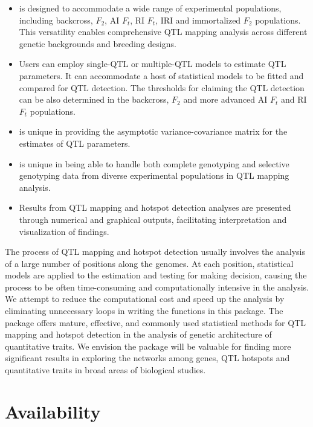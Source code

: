 \begin{itemize}
	\item {} is designed to accommodate a wide range of experimental populations, including backcross, $F_2$, AI $F_t$, RI $F_t$, IRI and immortalized $F_2$ populations. This versatility enables comprehensive QTL mapping analysis across different genetic backgrounds and breeding designs.
	\item Users can employ single-QTL or multiple-QTL models to estimate QTL parameters. It can accommodate a host of statistical models to be fitted and compared for QTL detection. The thresholds for claiming the QTL detection can be also determined in the backcross, $F_2$ and more advanced AI $F_t$ and RI $F_t$ populations.
	\item {} is unique in providing the asymptotic variance-covariance matrix for the estimates of QTL parameters.
	\item {} is unique in being able to handle both complete genotyping and selective genotyping data from diverse experimental populations in QTL mapping analysis.
	\item Results from QTL mapping and hotspot detection analyses are presented through numerical and graphical outputs, facilitating interpretation and visualization of findings.
\end{itemize}

\noindent The process of QTL mapping and hotspot detection usually involves the analysis of a large number of positions along the genomes. At each position, statistical models are applied to the estimation and testing for making decision, causing the process to be often time-consuming and computationally intensive in the analysis. We attempt to reduce the computational cost and speed up the analysis by eliminating unnecessary loops in writing the functions in this package. The  package offers mature, effective, and commonly used statistical methods for QTL mapping and hotspot detection in the analysis of genetic architecture of quantitative traits. We envision the  package will be valuable for finding more significant results in exploring the networks among genes, QTL hotspots and quantitative traits in broad areas of biological studies.

\section{Availability}

